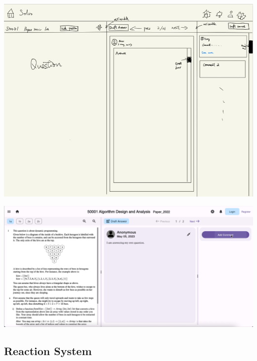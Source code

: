 \documentclass[a4paper]{article}
\begin{document}
    \\
    \begin{minipage}{0.4\textwidth}
        \centering
        \includegraphics[width=\textwidth]{concept1}
    \end{minipage}\hspace{0.05\textwidth}
    \begin{minipage}{0.57\textwidth}
        \centering
        \includegraphics[width=\textwidth]{question-page1}
    \end{minipage}

    \subsection*{Reaction System}
\end{document}
